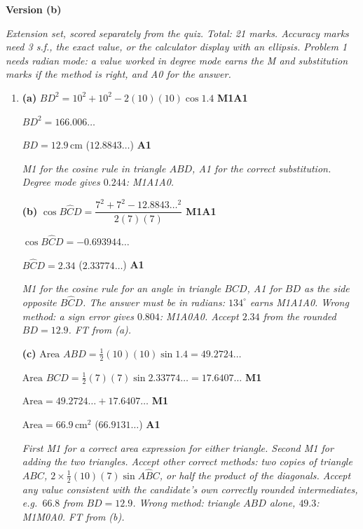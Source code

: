 \documentclass[12pt, twoside]{article}
\begin{document}
\newpage

\textbf{\large Version (b)}

\emph{Extension set, scored separately from the quiz. Total: 21 marks.
Accuracy marks need 3 s.f., the exact value, or the calculator display with
an ellipsis. Problem 1 needs radian mode: a value worked in degree mode
earns the M and substitution marks if the method is right, and A0 for the
answer.}

\begin{enumerate}[itemsep=0.3cm]

\item[1.] [Maximum mark: 11]

\textbf{(a)} $BD^{2} = 10^{2} + 10^{2} - 2(10)(10)\cos 1.4$ \hfill \textbf{M1A1}

$BD^{2} = 166.006\ldots$

$BD = 12.9\,\text{cm}$ \quad ($12.8843\ldots$) \hfill \textbf{A1}

\emph{M1 for the cosine rule in triangle $ABD$, A1 for the correct
substitution. Degree mode gives $0.244$: M1A1A0.}

\textbf{(b)} $\cos B\hat{C}D = \dfrac{7^{2} + 7^{2} - 12.8843\ldots^{2}}{2(7)(7)}$ \hfill \textbf{M1A1}

$\cos B\hat{C}D = -0.693944\ldots$

$B\hat{C}D = 2.34$ \quad ($2.33774\ldots$) \hfill \textbf{A1}

\emph{M1 for the cosine rule for an angle in triangle $BCD$, A1 for $BD$ as
the side opposite $B\hat{C}D$. The answer must be in radians: $134^\circ$
earns M1A1A0. Wrong method: a sign error gives $0.804$: M1A0A0. Accept
$2.34$ from the rounded $BD = 12.9$. FT from (a).}

\textbf{(c)} $\text{Area } ABD = \frac{1}{2}(10)(10)\sin 1.4 = 49.2724\ldots$

$\text{Area } BCD = \frac{1}{2}(7)(7)\sin 2.33774\ldots = 17.6407\ldots$ \hfill \textbf{M1}

$\text{Area} = 49.2724\ldots + 17.6407\ldots$ \hfill \textbf{M1}

$\text{Area} = 66.9\,\text{cm}^{2}$ \quad ($66.9131\ldots$) \hfill \textbf{A1}

\emph{First M1 for a correct area expression for either triangle. Second M1
for adding the two triangles. Accept other correct methods: two copies of
triangle $ABC$, $2 \times \frac{1}{2}(10)(7)\sin A\hat{B}C$, or half the
product of the diagonals. Accept any value consistent with the
candidate's own correctly rounded intermediates, e.g.\ $66.8$ from
$BD = 12.9$. Wrong method: triangle $ABD$ alone, $49.3$: M1M0A0. FT from
(b).}


\end{enumerate}
\end{document}
